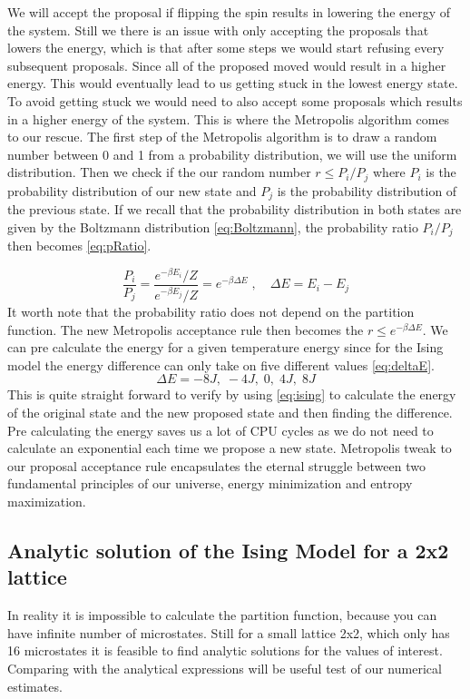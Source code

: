 We will
accept the proposal if flipping the spin results in lowering the energy of the
system. Still we there is an issue with only accepting the proposals that lowers
the energy, which is that after some steps we would start refusing every
subsequent proposals. Since all of the proposed moved would result in a higher
energy. This would eventually lead to us getting stuck in the lowest energy
state. To avoid getting stuck we would need to also accept some proposals which
results in a higher energy of the system. This is where the Metropolis
algorithm comes to our rescue. The first step of the Metropolis algorithm is to
draw a random number between 0 and 1 from a probability distribution, we will
use the uniform distribution. Then we check if the our random number $r \leq P_i
/P_j$ where $P_i$ is the probability distribution of our new state and $P_j$ is
the probability distribution of the previous state. If we recall that the
probability distribution in both states are given by the Boltzmann distribution
\cref{eq:Boltzmann}, the probability ratio $P_i/P_j$ then becomes \cref{eq:pRatio}.

\begin{equation}\label{eq:pRatio}
  \frac{P_i}{P_j} = \frac{e^{-\beta E_i}/Z}{e^{-\beta E_j}/Z} = e^{-\beta \Delta E} \; , \quad \Delta E = E_i - E_j
\end{equation}
It worth note that the probability ratio does not depend on the partition
function. The new Metropolis acceptance rule then becomes the $r \leq e^{-\beta
\Delta E}$.  We can
pre calculate the energy for a given temperature energy since for the Ising
model the energy difference can only take on five different values \cref{eq:deltaE}.
\begin{equation}\label{eq:deltaE}
  \Delta E = -8J, \; -4J, \; 0, \; 4J, \; 8J
\end{equation}
This is quite straight forward to verify by using \cref{eq:ising} to calculate
the energy of the original state and the new proposed
state and then finding the difference. Pre calculating the energy saves us a lot
of CPU cycles as we do not need to calculate an exponential each time we propose
a new state. Metropolis tweak to our proposal acceptance rule
encapsulates the eternal struggle between two fundamental principles of our
universe, energy minimization and entropy maximization.


\subsection{Analytic solution of the Ising Model for a 2x2 lattice}
In reality it is impossible to calculate the partition function, because you can
have infinite number of microstates. Still for a small lattice 2x2, which only
has 16 microstates it is
feasible to find analytic solutions for the values of
interest. Comparing with the analytical expressions will be useful test of our
numerical estimates.

